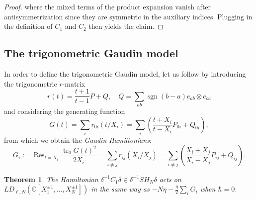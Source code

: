 \documentclass[11pt]{report}
\newtheorem{theorem}{Theorem}[section]
\theoremstyle{definition}
\theoremstyle{remark}
\theoremstyle{remark}
\newcommand{\C}{\mathbb{C}}
\begin{document}
\begin{proof}
where the mixed terms of the product expansion vanish after antisymmetrization since they are symmetric in the auxiliary indices. Plugging in the definition of $C_1$ and $C_2$ then yields the claim.
\end{proof}

\subsection{The trigonometric Gaudin model}

In order to define the trigonometric Gaudin model, let us follow \cite{article:molev:2019} by introducing the trigonometric $r$-matrix
\begin{equation*}
r(t) = \frac{t+1}{t-1} P + Q, \quad Q = \sum_{ab} \operatorname{sgn}(b-a) e_{ab} \otimes e_{ba}
\end{equation*}
and considering the generating function
\begin{equation*}
G(t) = \sum_i r_{0i}(t/X_i) = \sum_i \left( \frac{t+X_i}{t-X_i} P_{0i} + Q_{0i} \right),
\end{equation*}
from which we obtain the \emph{Gaudin Hamiltonians}:
\begin{equation*}
G_i := \operatorname{Res}_{t=X_i} \frac{\operatorname{tr}_0 G(t)^2}{2 X_i} = \sum_{i \neq j} r_{ij}(X_i/X_j) = \sum_{i \neq j} \left( \frac{X_i+X_j}{X_i-X_j} P_{ij} + Q_{ij} \right).
\end{equation*}

\begin{theorem}
The Hamiltonian $\delta^{-1} C_1 \delta \in \delta^{-1} S\ddot H_N \delta$ acts on $LD_{\ell,N}(\C[X_1^{\pm 1},...,X_N^{\pm 1}])$ in the same way as $-N\eta -\frac{\eta}{2} \sum_i G_i$ when $\hbar = 0$.
\end{theorem}
\end{document}
